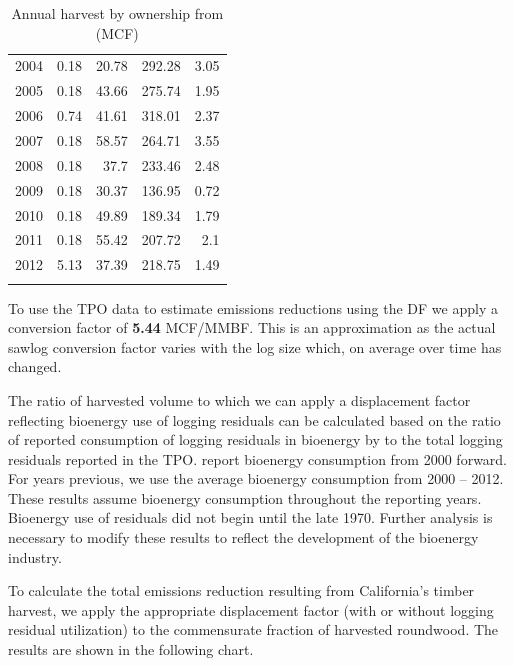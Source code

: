 \documentclass[a4paper]{article}
\begin{document}
\begin{longtable}{rrrrr}
2004 & 0.18 & 20.78 & 292.28 & 3.05\\
2005 & 0.18 & 43.66 & 275.74 & 1.95\\
2006 & 0.74 & 41.61 & 318.01 & 2.37\\
2007 & 0.18 & 58.57 & 264.71 & 3.55\\
2008 & 0.18 & 37.7 & 233.46 & 2.48\\
2009 & 0.18 & 30.37 & 136.95 & 0.72\\
2010 & 0.18 & 49.89 & 189.34 & 1.79\\
2011 & 0.18 & 55.42 & 207.72 & 2.1\\
2012 & 5.13 & 37.39 & 218.75 & 1.49\\
\caption{Annual harvest by ownership from \citet{Mciver2012} (MCF)}
\\
\end{longtable}

To use the TPO data to estimate emissions reductions using the DF we apply a
conversion factor of \textbf{5.44} MCF/MMBF. This is an approximation as the
actual sawlog conversion factor varies with the log size which, on
average over time has changed.  


The ratio of harvested volume to which we can apply a displacement
factor reflecting bioenergy use of logging residuals can be calculated
based on the ratio of reported consumption of logging residuals in
bioenergy by \citeauthor{Mciver2012} to the total logging residuals reported
in the TPO. \citeauthor{Mciver2012} report bioenergy consumption from 2000
forward. For years previous, we use the average bioenergy consumption
from 2000 -- 2012. These results assume bioenergy consumption
throughout the reporting years. Bioenergy use of residuals did not
begin until the late 1970. Further analysis is necessary to modify
these results to reflect the development of the bioenergy industry.

To calculate the total emissions reduction resulting from California's
timber harvest, we apply the appropriate displacement factor (with or
without logging residual utilization) to the commensurate fraction of
harvested roundwood. The results are shown in the following chart.
\end{document}
